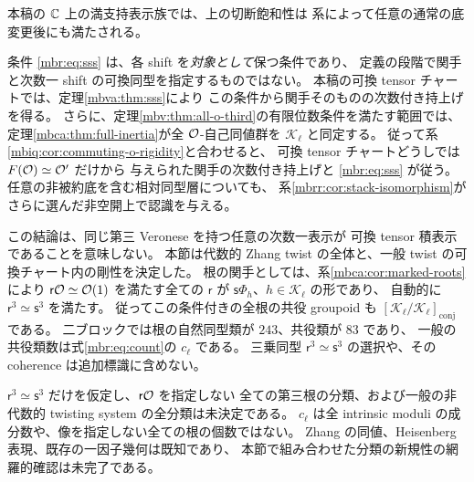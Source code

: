 本稿の $\mathbb C$ 上の満支持表示族では、上の切断飽和性は
系によって任意の通常の底変更後にも満たされる。

\begin{remark}[全自己同値の認識と未指定の第三根]
\label{mbr:rem:remaining-root-problem}
条件 \eqref{mbr:eq:sss} は、各 shift を\emph{対象として}保つ条件であり、
定義の段階で関手と次数一 shift の可換同型を指定するものではない。
本稿の可換 tensor チャートでは、定理\ref{mbva:thm:sss}により
この条件から関手そのものの次数付き持上げを得る。
さらに、定理\ref{mbv:thm:all-o-third}の有限位数条件を満たす範囲では、
定理\ref{mbca:thm:full-inertia}が全 $\mathcal O$-自己同値群を $\mathcal K_\ell$ と同定する。
従って系\ref{mbiq:cor:commuting-o-rigidity}と合わせると、
可換 tensor チャートどうしでは $F(\mathcal O)\simeq\mathcal O'$ だけから
与えられた関手の次数付き持上げと \eqref{mbr:eq:sss} が従う。
任意の非被約底を含む相対同型層についても、
系\ref{mbrr:cor:stack-isomorphism}がさらに選んだ非空開上で認識を与える。

この結論は、同じ第三 Veronese を持つ任意の次数一表示が
可換 tensor 積表示であることを意味しない。
本節は代数的 Zhang twist の全体と、一般 twist の可換チャート内の剛性を決定した。
根の関手としては、系\ref{mbca:cor:marked-roots}により
$\mathsf r\mathcal O\simeq\mathcal O(1)$ を満たす全ての $\mathsf r$ が
$\mathsf s\Phi_h$、$h\in\mathcal K_\ell$ の形であり、
自動的に $\mathsf r^3\simeq\mathsf s^3$ を満たす。
従ってこの条件付きの全根の共役 groupoid も
$[\mathcal K_\ell/\mathcal K_\ell]_{\mathrm{conj}}$ である。
二ブロックでは根の自然同型類が $243$、共役類が $83$ であり、
一般の共役類数は式\eqref{mbr:eq:count}の $c_\ell$ である。
三乗同型 $\mathsf r^3\simeq\mathsf s^3$ の選択や、その coherence は追加標識に含めない。

$\mathsf r^3\simeq\mathsf s^3$ だけを仮定し、$\mathsf r\mathcal O$ を指定しない
全ての第三根の分類、および一般の非代数的 twisting system の全分類は未決定である。
$c_\ell$ は全 intrinsic moduli の成分数や、像を指定しない全ての根の個数ではない。
Zhang の同値、Heisenberg 表現、既存の一因子幾何は既知であり、
本節で組み合わせた分類の新規性の網羅的確認は未完了である。
\end{remark}
